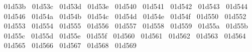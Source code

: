 {  ^^^^^^01d53b%
  ^^^^^^01d53c%
  ^^^^^^01d53d%
  ^^^^^^01d53e%
  ^^^^^^01d540%
  ^^^^^^01d541%
  ^^^^^^01d542%
  ^^^^^^01d543%
  ^^^^^^01d544%
  ^^^^^^01d546%
  ^^^^^^01d54a%
  ^^^^^^01d54b%
  ^^^^^^01d54c%
  ^^^^^^01d54d%
  ^^^^^^01d54e%
  ^^^^^^01d54f%
  ^^^^^^01d550%
  ^^^^^^01d552%
  ^^^^^^01d553%
  ^^^^^^01d554%
  ^^^^^^01d555%
  ^^^^^^01d556%
  ^^^^^^01d557%
  ^^^^^^01d558%
  ^^^^^^01d559%
  ^^^^^^01d55a%
  ^^^^^^01d55b%
  ^^^^^^01d55c%
  ^^^^^^01d55d%
  ^^^^^^01d55e%
  ^^^^^^01d55f%
  ^^^^^^01d560%
  ^^^^^^01d561%
  ^^^^^^01d562%
  ^^^^^^01d563%
  ^^^^^^01d564%
  ^^^^^^01d565%
  ^^^^^^01d566%
  ^^^^^^01d567%
  ^^^^^^01d568%
  ^^^^^^01d569%
}
